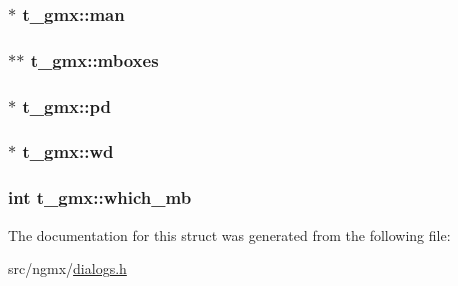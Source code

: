 \hypertarget{structt__gmx_a29ee57842ce2596445e2b55d79bbf471}{
\subsubsection[{man}]{$\ast$ {\bf t\-\_\-gmx\-::man}}}\label{structt__gmx_a29ee57842ce2596445e2b55d79bbf471}
\hypertarget{structt__gmx_acc41237c73f991a76e3721c59a3dddba}{
\subsubsection[{mboxes}]{$\ast$$\ast$ {\bf t\-\_\-gmx\-::mboxes}}}\label{structt__gmx_acc41237c73f991a76e3721c59a3dddba}
\hypertarget{structt__gmx_a5fb5ca1df22a7c57032156261c1b5740}{
\subsubsection[{pd}]{$\ast$ {\bf t\-\_\-gmx\-::pd}}}\label{structt__gmx_a5fb5ca1df22a7c57032156261c1b5740}
\hypertarget{structt__gmx_ab207676186a55123991edee52ad8c9fd}{
\subsubsection[{wd}]{$\ast$ {\bf t\-\_\-gmx\-::wd}}}\label{structt__gmx_ab207676186a55123991edee52ad8c9fd}
\hypertarget{structt__gmx_a3fe5fa106e34a686f0edd92b940fa599}{
\subsubsection[{which\-\_\-mb}]{\setlength{\rightskip}{0pt plus 5cm}int {\bf t\-\_\-gmx\-::which\-\_\-mb}}}\label{structt__gmx_a3fe5fa106e34a686f0edd92b940fa599}


\-The documentation for this struct was generated from the following file\-:\begin{DoxyCompactItemize}
\item 
src/ngmx/\hyperlink{dialogs_8h}{dialogs.\-h}\end{DoxyCompactItemize}
